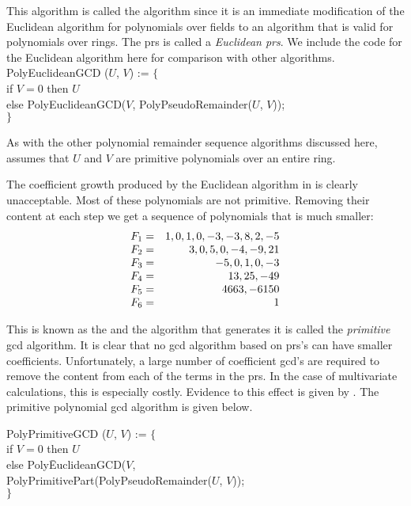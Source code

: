 This algorithm is called the  algorithm since
it is an immediate modification of the Euclidean algorithm for
polynomials over fields to an algorithm that is valid for polynomials
over rings.  The {\sc prs} is called a {\em Euclidean {\sc prs}}.  We
include the code for the Euclidean algorithm here for comparison with
other algorithms.
\begindsacode
PolyEuclideanGCD ($U$, $V$) := $\{$ \\
\> if $V=0$ then $U$ \\
\> else PolyEuclideanGCD($V$, PolyPseudoRemainder($U$, $V$)); \\
\> $\}$
\enddsacode

\noindent
As with the other polynomial remainder sequence algorithms discussed here,
 assumes that $U$ and $V$ are primitive polynomials
over an entire ring.

The coefficient growth produced by the Euclidean algorithm in
 is clearly unacceptable.  Most of these
polynomials are not primitive.  Removing their content at each step we
get a sequence of polynomials that is much smaller:
\begin{equation}
\begin{array}[15pt]{lr}
F_1=&1, 0, 1, 0, -3, -3, 8, 2, -5\\
F_2=&3, 0, 5, 0, -4, -9, 21\\
F_3=&-5, 0, 1, 0, -3\\
F_4=&13, 25, -49\\
F_5=& 4663, -6150\\
F_6=& 1
\end{array}
\label{Primitive:PRS:Eq}
\end{equation}

This is known as the  and the algorithm that
generates it is called the {\em primitive} {\sc gcd}
algorithm. It is clear that no {\sc
gcd} algorithm based on {\sc prs}'s can have smaller coefficients.
Unfortunately, a large number of coefficient {\sc gcd}'s are required
to remove the content from each of the terms in the {\sc prs}.  In the
case of multivariate calculations, this is especially costly.
Evidence to this effect is given by {\Collins}
\cite{Collins:Subresultant}.  The primitive polynomial {\sc gcd} 
algorithm is given below.

\begindsacode
PolyPrimitiveGCD ($U$, $V$) := $\{$\\
\> if $V=0$ then $U$ \\
\> else Poly\=EuclideanGCD($V$, \\
\> \>        PolyPrimitivePart(PolyPseudoRemainder($U$, $V$));\\
\> $\}$
\enddsacode

